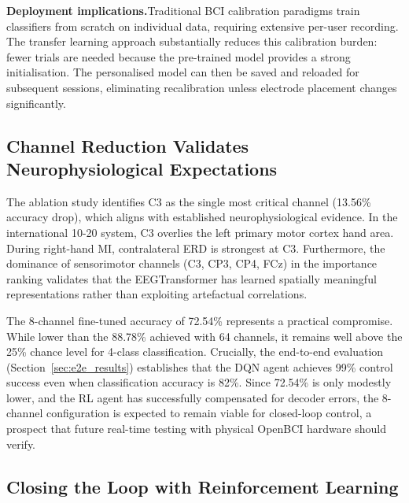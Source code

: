 \documentclass[12pt, a4paper]{article}
\begin{document}
\textbf{Deployment implications.}\quad Traditional BCI calibration paradigms train classifiers from scratch on individual data, requiring extensive per-user recording. The transfer learning approach substantially reduces this calibration burden: fewer trials are needed because the pre-trained model provides a strong initialisation. The personalised model can then be saved and reloaded for subsequent sessions, eliminating recalibration unless electrode placement changes significantly.

\subsection{Channel Reduction Validates Neurophysiological Expectations}

The ablation study identifies C3 as the single most critical channel (13.56\% accuracy drop), which aligns with established neurophysiological evidence. In the international 10-20 system, C3 overlies the left primary motor cortex hand area. During right-hand MI, contralateral ERD is strongest at C3. Furthermore, the dominance of sensorimotor channels (C3, CP3, CP4, FCz) in the importance ranking validates that the EEGTransformer has learned spatially meaningful representations rather than exploiting artefactual correlations.

The 8-channel fine-tuned accuracy of 72.54\% represents a practical compromise. While lower than the 88.78\% achieved with 64 channels, it remains well above the 25\% chance level for 4-class classification. Crucially, the end-to-end evaluation (Section~\ref{sec:e2e_results}) establishes that the DQN agent achieves 99\% control success even when classification accuracy is 82\%. Since 72.54\% is only modestly lower, and the RL agent has successfully compensated for decoder errors, the 8-channel configuration is expected to remain viable for closed-loop control, a prospect that future real-time testing with physical OpenBCI hardware should verify.

\subsection{Closing the Loop with Reinforcement Learning}
\end{document}

